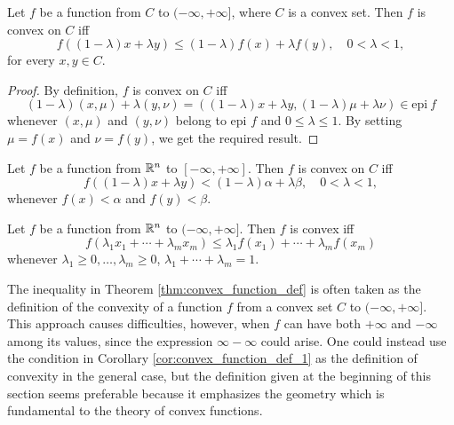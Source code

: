 \documentclass[11pt,a4paper]{article}
\begin{document}

\begin{theorem}\label{thm:convex_function_def}
    Let $f$ be a function from $C$ to $(-\infty,+\infty]$, where $C$ is a convex set. Then $f$ is convex on $C$ iff 
    \begin{equation*}
        f((1-\lambda)x+\lambda y) \le (1-\lambda) f(x) + \lambda f(y), \quad 0<\lambda < 1,
    \end{equation*}
    for every $x,y\in C$.
\end{theorem}

\begin{proof}
    By definition, $f$ is convex on $C$ iff 
    \begin{equation*}
        (1-\lambda)(x,\mu) + \lambda (y,\nu) = ((1-\lambda)x+\lambda y,(1-\lambda)\mu+\lambda \nu) \in \text{epi}\ f
    \end{equation*}
    whenever $(x,\mu)$ and $(y,\nu)$ belong to epi $f$ and $0\le\lambda\le 1$. By setting $\mu = f(x)$ and $\nu = f(y)$, we get the required result.
\end{proof}

\begin{corollary}\label{cor:convex_function_def_1}
    Let $f$ be a function from $\mathbb{R}^n$ to $[-\infty,+\infty]$. Then $f$ is convex on $C$ iff 
    \begin{equation*}
        f((1-\lambda)x+\lambda y) < (1-\lambda) \alpha + \lambda \beta, \quad 0<\lambda < 1,
    \end{equation*}
    whenever $f(x)<\alpha$ and $f(y)<\beta$.
\end{corollary}

\begin{corollary}\label{cor:convex_function_def_2}
    Let $f$ be a function from $\mathbb{R}^n$ to $(-\infty,+\infty]$. Then $f$ is convex iff 
    \begin{equation*}
        f(\lambda_1 x_1 + \cdots + \lambda_m x_m)\le \lambda_1 f(x_1) + \cdots + \lambda_m f(x_m)
    \end{equation*}
    whenever $\lambda_1\ge 0,\ldots,\lambda_m\ge 0$, $\lambda_1 + \cdots + \lambda_m = 1$.
\end{corollary}

\begin{remark}
    The inequality in Theorem \ref{thm:convex_function_def} is often taken as the definition of the convexity of a function $f$ from a convex set $C$ to $(-\infty,+\infty]$. This approach causes difficulties, however, when $f$ can have both $+\infty$ and $-\infty$ among its values, since the expression $\infty -\infty$ could arise. One could instead use the condition in Corollary \ref{cor:convex_function_def_1} as the definition of convexity in the general case, but the definition given at the beginning of this section seems preferable because it emphasizes the geometry which is fundamental to the theory of convex functions.
\end{remark}
\end{document}
